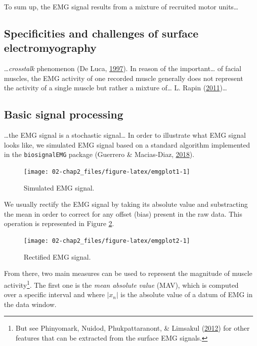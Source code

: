 \documentclass[a4paper,12pt,twoside,openright,oldfontcommands]{memoir}
\let\rmarkdownfootnote\footnote%
\def\footnote{\protect\rmarkdownfootnote}
\begin{document}
To sum up, the EMG signal results from a mixture of recruited motor
units\ldots{}

\subsection{Specificities and challenges of surface
electromyography}\label{specificities-and-challenges-of-surface-electromyography}

\ldots{}\emph{crosstalk} phenomenon (De Luca,
\protect\hyperlink{ref-de_luca_use_1997}{1997}). In reason of the
important\ldots{} of facial muscles, the EMG activity of one recorded
muscle generally does not represent the activity of a single muscle but
rather a mixture of\ldots{} L. Rapin
(\protect\hyperlink{ref-Rapin2011}{2011})\ldots{}

\subsection{Basic signal processing}\label{basic-signal-processing}

\ldots{}the EMG signal is a stochastic signal\ldots{} In order to
illustrate what EMG signal looks like, we simulated EMG signal based on
a standard algorithm implemented in the \texttt{biosignalEMG} package
(Guerrero \& Macias-Diaz, \protect\hyperlink{ref-R-biosignalEMG}{2018}).

\begin{figure}[H]

{\centering \texttt{[image: 02-chap2\_files/figure-latex/emgplot1-1]} 

}

\caption{Simulated EMG signal.}\label{fig:emgplot1}
\end{figure}

We usually rectify the EMG signal by taking its absolute value and
substracting the mean in order to correct for any offset (bias) present
in the raw data. This operation is represented in Figure
\ref{fig:emgplot2}.

\begin{figure}[H]

{\centering \texttt{[image: 02-chap2\_files/figure-latex/emgplot2-1]} 

}

\caption{Rectified EMG signal.}\label{fig:emgplot2}
\end{figure}

From there, two main measures can be used to represent the magnitude of
muscle activity\footnote{But see Phinyomark, Nuidod, Phukpattaranont, \&
  Limsakul (\protect\hyperlink{ref-phinyomark_feature_2012}{2012}) for
  other features that can be extracted from the surface EMG signals.}.
The first one is the \emph{mean absolute value} (MAV), which is computed
over a specific interval and where \(|x_{n}|\) is the absolute value of
a datum of EMG in the data window.
\end{document}
